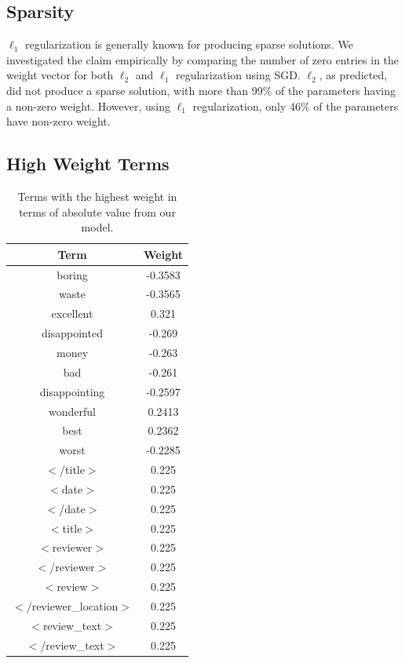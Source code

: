 \documentclass[11pt,leqno,twoside]{article}
\begin{document}
\subsection{Sparsity}
$\ell_1$ regularization is generally known for producing sparse solutions. We investigated
the claim empirically by comparing the number of zero entries in the weight vector for both $\ell_2$
and $\ell_1$ regularization using SGD. $\ell_2$, as predicted, did not produce a sparse solution, 
with more than 99\% of the parameters having a non-zero weight. However, using $\ell_1$ regularization,
only 46\% of the parameters have non-zero weight. 

\subsection{High Weight Terms}
\begin{table}
  \centering
  \begin{tabular}{|c|c|}
    \hline
    Term & Weight \\
    \hline
boring  &  -0.3583\\
waste  &  -0.3565\\
excellent  &  0.321\\
disappointed  &  -0.269\\
money  &  -0.263\\
bad  &  -0.261\\
disappointing  &  -0.2597\\
wonderful  &  0.2413\\
best  &  0.2362\\
worst  &  -0.2285\\
$<$/title$>$   &  0.225\\
$<$date$>$   &  0.225\\
$<$/date$>$   &  0.225\\
$<$title$>$   &  0.225\\
$<$reviewer$>$   &  0.225\\
$<$/reviewer$>$   &  0.225\\
$<$review$>$   &  0.225\\
$<$/reviewer\_location$>$   &  0.225\\
$<$review\_text$>$   &  0.225\\
$<$/review\_text$>$   &  0.225\\
    \hline
  \end{tabular}
    \caption{Terms with the highest weight in terms of absolute value from our model.}
    \label{tbl:weights}
\end{table}
\end{document}
